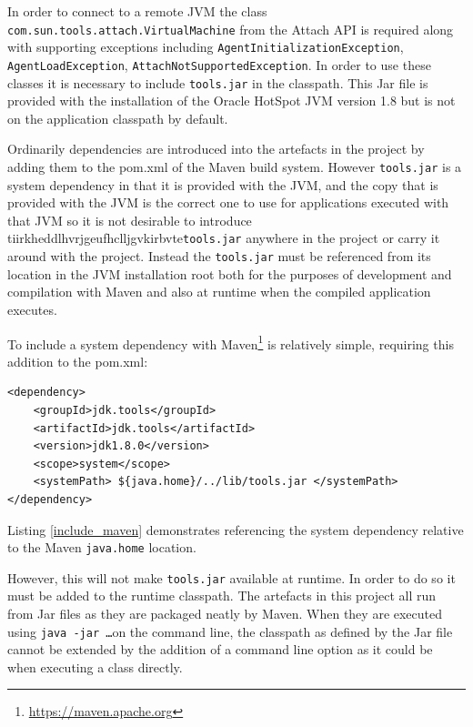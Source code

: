 \documentclass[]{final_report}
\begin{document}
In order to connect to a remote JVM the class \lstinline{com.sun.tools.attach.VirtualMachine} from the Attach API is required along with supporting exceptions including \lstinline{AgentInitializationException}, \lstinline{AgentLoadException}, \lstinline{AttachNotSupportedException}. In order to use these classes it is necessary to include \lstinline{tools.jar}\noop{} in the classpath. This Jar file is provided with the installation of the Oracle HotSpot JVM version 1.8 but is not on the application classpath by default.

Ordinarily dependencies are introduced into the artefacts in the project by adding them to the pom.xml of the Maven build system. However \lstinline{tools.jar}\noop{} is a system dependency in that it is provided with the JVM, and the copy that is provided with the JVM is the correct one to use for applications executed with that JVM so it is not desirable to introduce tiirkheddlhvrjgeufhclljgvkirbvte\lstinline{tools.jar}\noop{} anywhere in the project or carry it around with the project. Instead the \lstinline{tools.jar}\noop{} must be referenced from its location in the JVM installation root both for the purposes of development and compilation with Maven and also at runtime when the compiled application executes.

To include a system dependency with Maven\footnote{\url{https://maven.apache.org}} is relatively simple, requiring this addition to the pom.xml:

\begin{lstlisting}[caption=Including a System Dependency with Maven, label={include_maven}]
<dependency>
    <groupId>jdk.tools</groupId>
    <artifactId>jdk.tools</artifactId>
    <version>jdk1.8.0</version>
    <scope>system</scope>
    <systemPath> ${java.home}/../lib/tools.jar </systemPath>
</dependency>
\end{lstlisting}

Listing \ref{include_maven} demonstrates referencing the system dependency relative to the Maven \lstinline{java.home}\noop{} location.

However, this will not make \lstinline{tools.jar}\noop{} available at runtime. In order to do so it must be added to the runtime classpath. The artefacts in this project all run from Jar files as they are packaged neatly by Maven. When they are executed using \lstinline{java -jar …}\noop{}on the command line, the classpath as defined by the Jar file cannot be extended by the addition of a command line option as it could be when executing a class directly.
\end{document}
